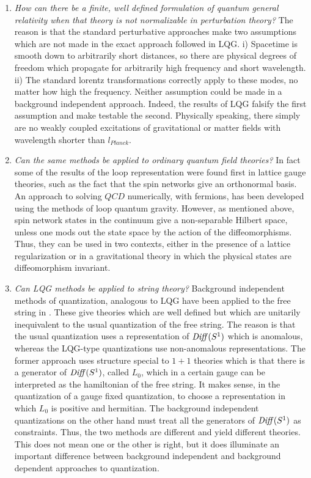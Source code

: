 \documentclass[12pt]{article}
\def\Diff{\mathop{\it Diff}}
\begin{document}
\begin{enumerate}

\item{}{\it How can there be a finite, well defined formulation of quantum general
relativity when that theory is not normalizable in perturbation theory?}  The reason is
that the standard perturbative approaches make two assumptions which are not made
in the exact approach followed in LQG. i)  Spacetime is smooth down to arbitrarily short distances, so there are physical degrees of freedom which propagate for arbitrarily high frequency and short wavelength. ii)  The standard lorentz transformations correctly apply to these modes, no matter how high the frequency. Neither assumption  could be made in a background independent approach. Indeed, the results of LQG falsify the first assumption and make testable the second.  Physically speaking, there simply are no weakly coupled excitations of 
gravitational or matter fields with wavelength shorter than $l_{Planck}$.  

\item{}{\it Can the same methods be applied to ordinary quantum field theories?}
In fact some of the results of the loop representation were found first in 
lattice gauge theories, such as 
the fact that the spin networks give an orthonormal
basis\cite{lattice-old}.  An approach to solving $QCD$ numerically, with
fermions, has been developed using the methods of loop quantum gravity\cite{latticeloop}.
However, as mentioned above, spin network states in the continuum give
a non-separable Hilbert space, unless one mods out the state space by the
action of the diffeomorphisms. Thus, they can be used in two contexts,
either in the presence of a lattice regularization or in a gravitational theory
in which the physical states are diffeomorphism invariant. 

\item{}{\it Can LQG methods be applied to string theory?} Background
independent methods of quantization, analogous to LQG have been
applied to the free string in \cite{artem-string,thomas-string,HP-string}.  These
give theories which are well defined but which are unitarily inequivalent
to the usual quantization of the free string. The reason is that the usual
quantization uses a representation of $\Diff(S^1 )$ which is anomalous,
whereas the LQG-type quantizations use non-anomalous representations.
The former approach uses structure special to $1+1$ theories which is that
there is a generator of $\Diff(S^1)$, called $L_0$, which in a certain
gauge can be interpreted as the hamiltonian of the free string. It
makes sense, in the quantization of a gauge fixed quantization, to choose
a representation in which $L_0$ is positive and hermitian.  The background
independent quantizations on the other hand must treat all the generators
of $\Diff(S^1 )$ as constraints.  Thus, the two methods are different
and yield different theories. This does not mean one or the other is right,
but it does illuminate an important difference between background
independent and background dependent approaches to quantization. 


\end{enumerate}
\end{document}
